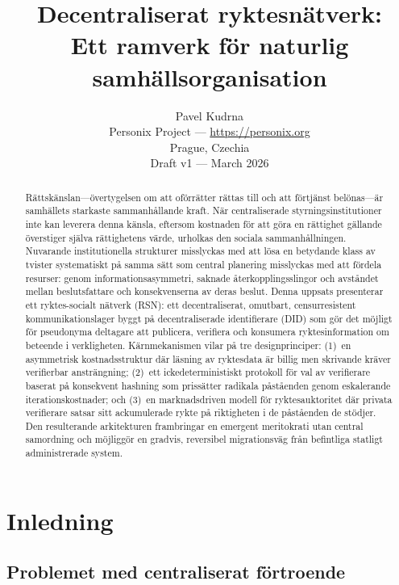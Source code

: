 \documentclass[11pt,a4paper,twocolumn]{article}
\title{\textbf{Decentraliserat ryktesnätverk:\\Ett ramverk för naturlig samhällsorganisation}}
\author{Pavel Kudrna\\Personix Project --- \url{https://personix.org}\\Prague, Czechia\\Draft v1 --- March 2026}
\date{}
\begin{document}
\maketitle

\begin{abstract}
Rättskänslan---övertygelsen om att oförrätter rättas till och att förtjänst belönas---är samhällets starkaste sammanhållande kraft. När centraliserade styrningsinstitutioner inte kan leverera denna känsla, eftersom kostnaden för att göra en rättighet gällande överstiger själva rättighetens värde, urholkas den sociala sammanhållningen. Nuvarande institutionella strukturer misslyckas med att lösa en betydande klass av tvister systematiskt på samma sätt som central planering misslyckas med att fördela resurser: genom informationsasymmetri, saknade återkopplingsslingor och avståndet mellan beslutsfattare och konsekvenserna av deras beslut. Denna uppsats presenterar ett ryktes-socialt nätverk (RSN): ett decentraliserat, omutbart, censurresistent kommunikationslager byggt på decentraliserade identifierare (DID) som gör det möjligt för pseudonyma deltagare att publicera, verifiera och konsumera ryktesinformation om beteende i verkligheten. Kärnmekanismen vilar på tre designprinciper: (1)~en asymmetrisk kostnadsstruktur där läsning av ryktesdata är billig men skrivande kräver verifierbar ansträngning; (2)~ett ickedeterministiskt protokoll för val av verifierare baserat på konsekvent hashning som prissätter radikala påståenden genom eskalerande iterationskostnader; och (3)~en marknadsdriven modell för ryktesauktoritet där privata verifierare satsar sitt ackumulerade rykte på riktigheten i de påståenden de stödjer. Den resulterande arkitekturen frambringar en emergent meritokrati utan central samordning och möjliggör en gradvis, reversibel migrationsväg från befintliga statligt administrerade system.
\end{abstract}

\section{Inledning}

\subsection{Problemet med centraliserat förtroende}
\end{document}
